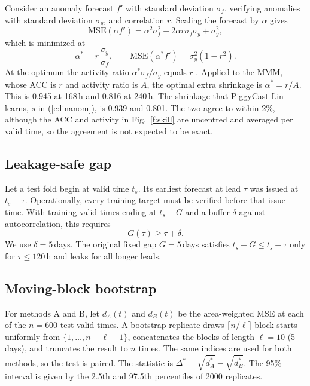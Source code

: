 \documentclass[twocol]{ametsocV6.1}
\newcommand{\PCLin}{PiggyCast-Lin}
\begin{document}
Consider an anomaly forecast $f'$ with standard deviation $\sigma_f$, verifying anomalies with standard deviation $\sigma_y$, and correlation $r$. Scaling the forecast by $\alpha$ gives
\begin{equation}
\mathrm{MSE}(\alpha f')=\alpha^2\sigma_f^2-2\alpha r\sigma_f\sigma_y+\sigma_y^2,
\end{equation}
which is minimized at
\begin{equation}
\alpha^*=r\,\frac{\sigma_y}{\sigma_f},\qquad \mathrm{MSE}(\alpha^* f')=\sigma_y^2(1-r^2). \label{e:murphy}
\end{equation}
At the optimum the activity ratio $\alpha^*\sigma_f/\sigma_y$ equals $r$ \citep{murphy1988skill}. Applied to the MMM, whose ACC is $r$ and activity ratio is $A$, the optimal extra shrinkage is $\alpha^*=r/A$. This is 0.945 at 168\,h and 0.816 at 240\,h. The shrinkage that \PCLin{} learns, $s$ in (\ref{e:linanom}), is 0.939 and 0.801. The two agree to within 2\%, although the ACC and activity in Fig.~\ref{f:skill} are uncentred and averaged per valid time, so the agreement is not expected to be exact.

\subsection{Leakage-safe gap}

Let a test fold begin at valid time $t_s$. Its earliest forecast at lead $\tau$ was issued at $t_s-\tau$. Operationally, every training target must be verified before that issue time. With training valid times ending at $t_s-G$ and a buffer $\delta$ against autocorrelation, this requires
\begin{equation}
G(\tau)\ge\tau+\delta. \label{e:gap}
\end{equation}
We use $\delta=5$\,days. The original fixed gap $G=5$\,days satisfies $t_s-G\le t_s-\tau$ only for $\tau\le120$\,h and leaks for all longer leads.

\subsection{Moving-block bootstrap}

For methods A and B, let $d_A(t)$ and $d_B(t)$ be the area-weighted MSE at each of the $n=600$ test valid times. A bootstrap replicate draws $\lceil n/\ell\rceil$ block starts uniformly from $\{1,\dots,n-\ell+1\}$, concatenates the blocks of length $\ell=10$ (5 days), and truncates the result to $n$ times. The same indices are used for both methods, so the test is paired. The statistic is $\Delta^*=\sqrt{\overline{d_A^*}}-\sqrt{\overline{d_B^*}}$. The 95\% interval is given by the 2.5th and 97.5th percentiles of 2000 replicates.
\end{document}
